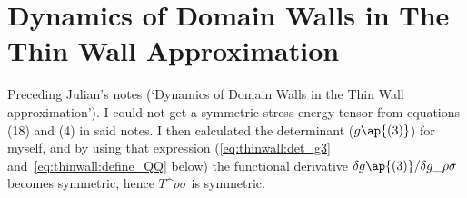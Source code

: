 
\section{Dynamics of Domain Walls in The Thin Wall Approximation}



\newcommand*{\mfa}{\mathfrak{a}}
\newcommand*{\mfb}{\mathfrak{b}}
\newcommand*{\mfc}{\mathfrak{c}}
\newcommand*{\QQ}[1][\mu\nu\kappa\lambda\alpha\beta]{\mathbf{Q}\^{#1}}
\newcommand*{\xdw}{{x\ped{dw}}}



Preceding Julian's notes (`Dynamics of Domain Walls in the Thin Wall approximation'). I could not get a symmetric stress-energy tensor from equations (18) and (4) in said notes. I then calculated the determinant ($g\ap{(3)}$) for myself, and by using that expression (\cref{eq:thinwall:det_g3} and~\cref{eq:thinwall:define_QQ} below) the functional derivative $\delta g\ap{(3)}/\delta g\_{\rho\sigma}$ becomes symmetric, hence $T\^{\rho\sigma}$ is symmetric.




